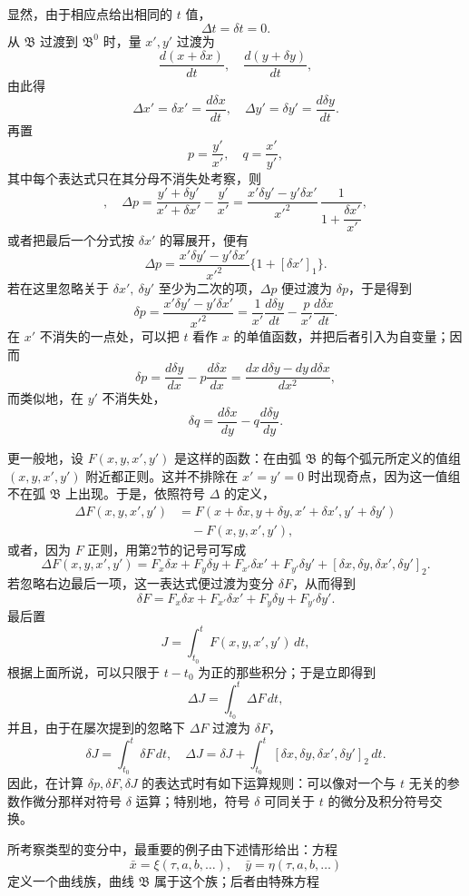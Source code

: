 \documentclass[11pt,a4paper,leqno]{article}
\begin{document}
显然，由于相应点给出相同的 $t$ 值，
\[
 \Delta t=\delta t=0.
\]
从 $\mathfrak{B}$ 过渡到 $\mathfrak{B}^0$ 时，量 $x',y'$ 过渡为
\[
 \frac{d(x+\delta x)}{dt},\quad \frac{d(y+\delta y)}{dt},
\]
由此得
\[
 \Delta x'=\delta x'=\frac{d\delta x}{dt},\quad
 \Delta y'=\delta y'=\frac{d\delta y}{dt}.
\]
再置
\[
 p=\frac{y'}{x'},\quad q=\frac{x'}{y'},
\]
其中每个表达式只在其分母不消失处考察，则
\[
 ,\quad
 \Delta p=\frac{y'+\delta y'}{x'+\delta x'}-\frac{y'}{x'}
 =\frac{x'\delta y'-y'\delta x'}{x'^2}\,\frac{1}{1+\dfrac{\delta x'}{x'}},
\]
或者把最后一个分式按 $\delta x'$ 的幂展开，便有
\[
 \Delta p=\frac{x'\delta y'-y'\delta x'}{x'^2}\{1+[\delta x']_1\}.
\]
若在这里忽略关于 $\delta x',\ \delta y'$ 至少为二次的项，$\Delta p$ 便过渡为 $\delta p$，于是得到
\[
 \delta p=\frac{x'\delta y'-y'\delta x'}{x'^2}=\frac{1}{x'}\frac{d\delta y}{dt}-\frac{p}{x'}\frac{d\delta x}{dt}.
\]
在 $x'$ 不消失的一点处，可以把 $t$ 看作 $x$ 的单值函数，并把后者引入为自变量；因而
\[
 \delta p=\frac{d\delta y}{dx}-p\frac{d\delta x}{dx}
 =\frac{dx\,d\delta y-dy\,d\delta x}{dx^2},
\]
而类似地，在 $y'$ 不消失处，
\[
 \delta q=\frac{d\delta x}{dy}-q\frac{d\delta y}{dy}.
\]

更一般地，设 $F(x,y,x',y')$ 是这样的函数：在由弧 $\mathfrak{B}$ 的每个弧元所定义的值组 $(x,y,x',y')$ 附近都正则。这并不排除在 $x'=y'=0$ 时出现奇点，因为这一值组不在弧 $\mathfrak{B}$ 上出现。于是，依照符号 $\Delta$ 的定义，
\[
\begin{aligned}
 \Delta F(x,y,x',y')
 &=F(x+\delta x,y+\delta y,x'+\delta x',y'+\delta y')\\
 &\quad{}-F(x,y,x',y'),
\end{aligned}
\]
或者，因为 $F$ 正则，用第2节的记号可写成
\[
 \Delta F(x,y,x',y')
 =F_x\delta x+F_y\delta y+F_{x'}\delta x'+F_{y'}\delta y'
 +[\delta x,\delta y,\delta x',\delta y']_2.
\]
若忽略右边最后一项，这一表达式便过渡为变分 $\delta F$，从而得到
\[
 \delta F=F_x\delta x+F_{x'}\delta x'+F_y\delta y+F_{y'}\delta y'.
\]
最后置
\[
 J=\int_{t_0}^{t} F(x,y,x',y')\,dt,
\]
根据上面所说，可以只限于 $t-t_0$ 为正的那些积分；于是立即得到
\[
 \Delta J=\int_{t_0}^{t}\Delta F\,dt,
\]
并且，由于在屡次提到的忽略下 $\Delta F$ 过渡为 $\delta F$，
\[
 \delta J=\int_{t_0}^{t}\delta F\,dt,\quad
 \Delta J=\delta J+\int_{t_0}^{t}[\delta x,\delta y,\delta x',\delta y']_2\,dt.
\]
因此，在计算 $\delta p,\delta F,\delta J$ 的表达式时有如下运算规则：可以像对一个与 $t$ 无关的参数作微分那样对符号 $\delta$ 运算；特别地，符号 $\delta$ 可同关于 $t$ 的微分及积分符号交换。

所考察类型的变分中，最重要的例子由下述情形给出：方程
\begin{equation}\tag{1}
 \bar{x}=\xi(\tau,a,b,\ldots),\quad \bar{y}=\eta(\tau,a,b,\ldots)
\end{equation}
定义一个曲线族，曲线 $\mathfrak{B}$ 属于这个族；后者由特殊方程
\end{document}

